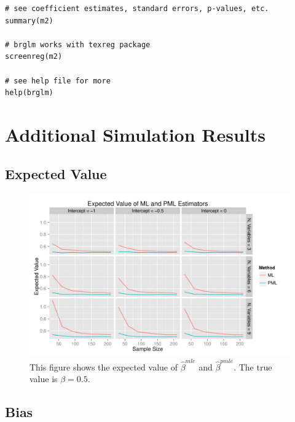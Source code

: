 \documentclass[12pt]{article}
\begin{document}
\begin{appendix}
\begin{verbatim}
# see coefficient estimates, standard errors, p-values, etc.
summary(m2)

# brglm works with texreg package
screenreg(m2)

# see help file for more
help(brglm)
\end{verbatim}



\section{Additional Simulation Results}\label{sec:app-sims}

\subsection{Expected Value}

\begin{figure}[H]
\begin{center}
\includegraphics[width = \textwidth]{figs/sims-ev.pdf}
\caption{This figure shows the expected value of $\hat{\beta}^{mle}$ and $\hat{\beta}^{pmle}$. The true value is $\beta = 0.5$.}\label{fig:ev}
\end{center}
\end{figure}

\subsection{Bias}


\end{appendix}
\end{document}
